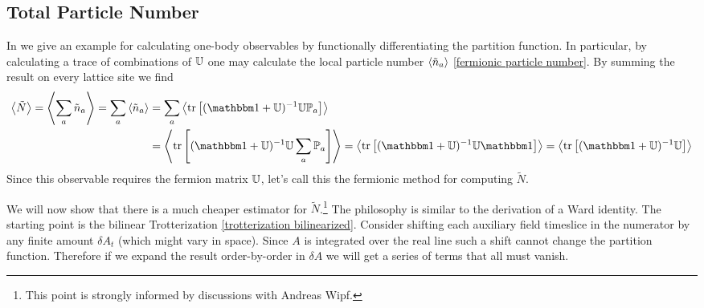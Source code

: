 \subsection{Total Particle Number}\label{sec:number}

In  we give an example for calculating one-body observables by functionally differentiating the partition function.
In particular, by calculating a trace of combinations of $\mathbb{U}$ one may calculate the local particle number $\left\langle \tilde{n}_a \right\rangle$ \eqref{fermionic particle number}.
By summing the result on every lattice site we find
\begin{align}
	\expectation{\tilde{N}}
	=
	\expectation{\sum_a \tilde{n}_a}
	=
	\sum_a \expectation{\tilde{n}_a}
	&=
	\sum_a \expectation{\tr{(\one+\UU)\inverse \UU \PP_a}}
	\nonumber\\
	&=
	\expectation{\tr{(\one+\UU)\inverse \UU \sum_a \PP_a}}
	=
	\expectation{\tr{(\one+\UU)\inverse \UU \one}}
	=
	\expectation{\tr{(\one+\UU)\inverse \UU}}
	\label{eq:fermionic total number}
\end{align}
Since this observable requires the fermion matrix $\mathbb{U}$, let's call this the fermionic method for computing $\tilde{N}$.

We will now show that there is a much cheaper estimator for $\tilde{N}$.\footnote{This point is strongly informed by discussions with Andreas Wipf.}
The philosophy is similar to the derivation of a Ward identity.
The starting point is the bilinear Trotterization \eqref{trotterization bilinearized}.
Consider shifting each auxiliary field timeslice in the numerator by any finite amount $\delta A_t$ (which might vary in space).
Since $A$ is integrated over the real line such a shift cannot change the partition function.
Therefore if we expand the result order-by-order in $\delta A$ we will get a series of terms that all must vanish.

